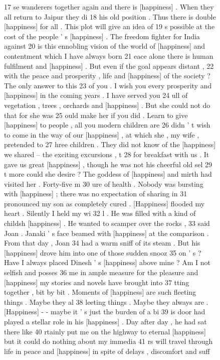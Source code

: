 \begin{figure}[!htbp]
\begin{fitverb}
17 se wanderers together again and there is [happiness] . When they all return to Jaipur they di
18  his old position . Thus there is double [happiness] for all . This plot will give an idea of
19 s possible at the cost of the people ' s [happiness] . The freedom fighter for India against 
20 is this ennobling vision of the world of [happiness] and contentment which I have always born
21 eace alone there is human fulfilment and [happiness] . But even if the goal appears distant ,
22 with the peace and prosperity , life and [happiness] of the society ? The only answer to this
23 of you . I wish you every prosperity and [happiness] in the coming years . I have served you 
24 ull of vegetation , trees , orchards and [happiness] . But she could not do that for she was 
25 ould make her if you did . Learn to give [happiness] to people , all you modern children are 
26  didn ' t wish to come in the way of our [happiness] , at which she , my wife , pretended to 
27 hree children . They did not know of the [happiness] we shared -- the exciting excursions , t
28 for breakfast with us . It gave us great [happiness] , though he was not his cheerful old sel
29 t more could she desire ? The goddess of [happiness] and mirth had visited her . Forty-five m
30 ure of health . Nobody was bursting with [happiness] ; there was no expectation of sharing in
31  pronounced my son as completely cured . [Happiness] flooded my heart . Silently I held my wi
32 l . He was filled with a kind of childsh [happiness] . He wanted to scamper over the rocks , 
33  said Joan . Janaki ' s face beamed with [happiness] at the comparison . From that day , Joan
34  had a warm sniff of its steam . But his [happiness] drove him into one of those sudden snooz
35 on ' s ? Have I always placed Dinesh ' s [happiness] above mine ? Am I not selfish and posses
36 me in ample measure for the pleasure and [happiness] my stories and novels have brought into 
37 tting together , bit by bit . Moments of [happiness] are such fleeting things . Maybe they al
38 leeting things . Maybe they always are . [Happiness] - - maybe it ' s just the burden of a bi
39 is door had played a stellar role in his [happiness] . Day after day , he had sat there like 
40 rtainly put me on the highway to eternal [happiness] but it could do nothing about my immedia
41 rs will travel through life in peace and [happiness] in spite of delays , discomfort and suff
\end{fitverb}
\end{figure}


